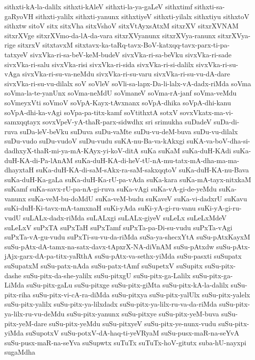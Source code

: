 {sithxti-kA-la-dalilx
sithxti-kAleV
sithxti-la-ya-gaLeV
sithxtimf
sithxti-sa-gaRyoVH
sithxti-yalilx
sithxti-yanunx
sithxtiyeV
sithxti-yilalx
sithxtiyu
sithxtoV
sithxtw
sitoV
sitx
sitxVha
sitxVshoV
sitxVtAyxsAtxM
sitxrXV
sitxrXVNAM
sitxrXVge
sitxrXVmo-da-lA-da-vara
sitxrXVyanunx
sitxrXVya-ranunx
sitxrXVya-rige
sitxrxV
sitxtavxM
sitxtavx-ka-taRq-tavx-BoV-katxqq-tavx-parx-ti-pa-tatxyeV
sivxVka-ri-sa-beV-keM-budeV
sivxVka-ri-sa-beVku
sivxVka-ri-sade
sivxVka-ri-salu
sivxVka-risi
sivxVka-ri-sida
sivxVka-ri-si-dalilx
sivxVka-ri-su-vAga
sivxVka-ri-su-va-neMdu
sivxVka-ri-su-varu
sivxVka-ri-su-vu-dA-dare
sivxVka-ri-su-vu-dilalx
soV
soVleV
soVli-sa-lapx-Da-li-lalx-vA-dadx-riMda
soVma
soVma-la-te-yanUnx
soVma-neMdU
soVmaneV
soVma-rA-janf
soVma-veMdu
soVmeyxVti
soVmoV
soVpA-Kayx-tAvxnanx
soVpA-dhika
soVpA-dhi-kanu
soVpA-dhi-ka-vAgi
soVpa-pa-titx-kamf
soVtithxtA
sotxV
sovxVkatx-ma-vi-samxqqtayx
sovxVpeV-yA-thaR-parx-sidwdhx
sri
srimukha
suDadeV
suDa-di-ruva
suDa-leV-beVku
suDuva
suDu-vaMte
suDu-vu-deM-buva
suDu-vu-dilalx
suDu-vudo
suDu-vudoV
suDu-vudu
suKA-nu-Ba-va-kAkxgi
suKA-va-boV-dha-si-dadhxyX-thaR-mi-ya-mA-KAyx-yi-koV-ditA
suKa
suKaM
suKa-duH-KAdi
suKa-duH-KA-di-Pa-lAnAM
suKa-duH-KA-di-heV-tU-nA-mu-tatx-mA-dha-ma-ma-dhayxtaH
suKa-duH-KA-di-saM-sAkx-ra-saM-sakxqqtoV
suKa-duH-KA-nu-Bava
suKa-duH-Ka-gaLa
suKa-duH-Ka-rU-pa-vAda
suKa-kara
suKa-mA-tayx-nitxkaM
suKamf
suKa-savx-rU-pa-nA-gi-ruva
suKa-vAgi
suKa-vA-gi-de-yeMdu
suKa-vanunx
suKa-veM-bu-doMdU
suKa-veM-budu
suKaveV
suKa-vi-dadxrU
suKavu
suKi-duH-Ki-tavx-mA-tamxnaH
suKi-yAda
suKi-yA-gi-ru-vanu
suKi-yA-gi-ru-vudU
suLALx-dadx-riMda
suLALxgi
suLALx-giyeV
suLeLx
suLeLxMdeV
suLeLxV
suPxTA
suPxTaH
suPxTamf
suPxTa-pa-Di-su-vudu
suPxTa-vAgi
suPxTa-vA-gu-vudu
suPxTi-su-vu-da-riMda
suSa-ya-shecxYtA
suSu-pAtxKayxM
suSu-pAtx-dA-tamx-na-satx-davx-tApxrX-NA-diVnAM
suSu-pAtxdw
suSu-pAtx-jAjx-garx-dA-pa-titx-yaRthA
suSu-pAtx-va-sethx-yiMda
suSu-pasxti
suSupatx
suSupatxM
suSu-patx-nAda
suSu-patx-tAmf
suSupetxV
suSupitx
suSu-pitx-dashe
suSu-pitx-da-she-yalilx
suSu-pitxgU
suSu-pitx-ga-Lalilx
suSu-pitx-ga-LiMda
suSu-pitx-gaLu
suSu-pitxge
suSu-pitx-giMta
suSu-pitx-kA-la-dalilx
suSu-pitx-riha
suSu-pitx-vi-cA-ra-diMda
suSu-pitxya
suSu-pitx-yalUlx
suSu-pitx-yalelx
suSu-pitx-yalilx
suSu-pitx-ya-lilxdadx
suSu-pitx-ya-lilx-ru-va-da-riMda
suSu-pitx-ya-lilx-ru-vu-deMdu
suSu-pitx-yanunx
suSu-pitxye
suSu-pitx-yeM-buva
suSu-pitx-yeM-dare
suSu-pitx-yeMdu
suSu-pitxyeV
suSu-pitx-ye-nunx-vudu
suSu-pitx-yiMda
suSupotxV
suSu-potxV-dA-haq-ti-yeVRyaM
suSu-pusx-maR-na-seYvA
suSu-pusx-maR-na-seYva
suSupwtx
suTuTx
suTuTx-hoV-gitutx
suba-hU-nayxpi
sugaMdha
}
